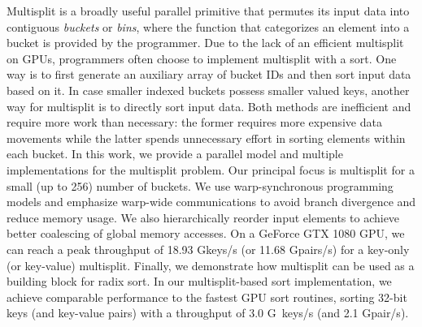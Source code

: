 Multisplit is a broadly useful parallel primitive that permutes its input data into contiguous \emph{buckets} or \emph{bins}, where the function that categorizes an element into a bucket is provided by the programmer.
Due to the lack of an efficient multisplit on GPUs, programmers often choose to implement multisplit with a sort.
One way is to first generate an auxiliary array of bucket IDs and then sort input data based on it.
In case smaller indexed buckets possess smaller valued keys, another way for multisplit is to directly sort input data.
Both methods are inefficient and require more work than necessary: the former requires more expensive data movements while the latter spends unnecessary effort in sorting elements within each bucket.
In this work, we provide a parallel model and multiple implementations for the multisplit problem. Our principal focus is multisplit for a small (up to 256) number of buckets.
We use warp-synchronous programming models and emphasize warp-wide communications to avoid branch divergence and reduce memory usage.
We also hierarchically reorder input elements to achieve better coalescing of global memory accesses.
On a GeForce GTX 1080 GPU, we can reach a peak throughput of 18.93 Gkeys/s (or 11.68 Gpairs/s) for a  key-only (or key-value) multisplit.
Finally, we demonstrate how multisplit can be used as a building block for radix sort. In our multisplit-based sort implementation, we achieve comparable performance to the fastest GPU sort routines, sorting 32-bit keys (and key-value pairs) with a throughput of 3.0 G~keys/s (and 2.1 Gpair/s).

